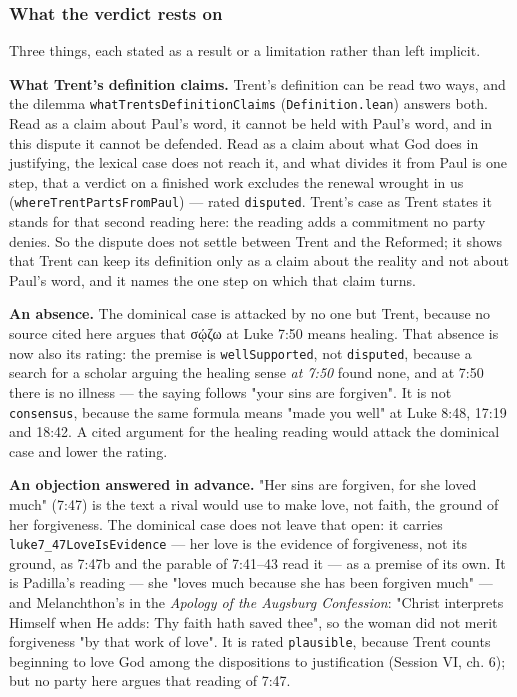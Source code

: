 \documentclass[11pt]{article}
\begin{document}
\subsubsection*{What the verdict rests on}
Three things, each stated as a result or a limitation rather than left implicit.

\textbf{What Trent's definition claims.} Trent's definition can be read two ways, and the dilemma \texttt{what\allowbreak{}Trents\allowbreak{}Definition\allowbreak{}Claims} (\texttt{Definition.lean}) answers both. Read as a claim about Paul's word, it cannot be held with Paul's word, and in this dispute it cannot be defended. Read as a claim about what God does in justifying, the lexical case does not reach it, and what divides it from Paul is one step, that a verdict on a finished work excludes the renewal wrought in us (\texttt{where\allowbreak{}Trent\allowbreak{}Parts\allowbreak{}From\allowbreak{}Paul}) — rated \texttt{disputed}. Trent's case as Trent states it stands for that second reading here: the reading adds a commitment no party denies. So the dispute does not settle between Trent and the Reformed; it shows that Trent can keep its definition only as a claim about the reality and not about Paul's word, and it names the one step on which that claim turns.

\textbf{An absence.} The dominical case is attacked by no one but Trent, because no source cited here argues that σῴζω at Luke 7:50 means healing. That absence is now also its rating: the premise is \texttt{well\allowbreak{}Supported}, not \texttt{disputed}, because a search for a scholar arguing the healing sense \emph{at 7:50} found none, and at 7:50 there is no illness — the saying follows "your sins are forgiven". It is not \texttt{consensus}, because the same formula means "made you well" at Luke 8:48, 17:19 and 18:42. A cited argument for the healing reading would attack the dominical case and lower the rating.

\textbf{An objection answered in advance.} "Her sins are forgiven, for she loved much" (7:47) is the text a rival would use to make love, not faith, the ground of her forgiveness. The dominical case does not leave that open: it carries \texttt{luke7\_\allowbreak{}47\allowbreak{}Love\allowbreak{}Is\allowbreak{}Evidence} — her love is the evidence of forgiveness, not its ground, as 7:47b and the parable of 7:41–43 read it — as a premise of its own. It is Padilla's reading — she "loves much because she has been forgiven much" — and Melanchthon's in the \emph{Apology of the Augsburg Confession}: "Christ interprets Himself when He adds: Thy faith hath saved thee", so the woman did not merit forgiveness "by that work of love". It is rated \texttt{plausible}, because Trent counts beginning to love God among the dispositions to justification (Session VI, ch. 6); but no party here argues that reading of 7:47.
\end{document}
